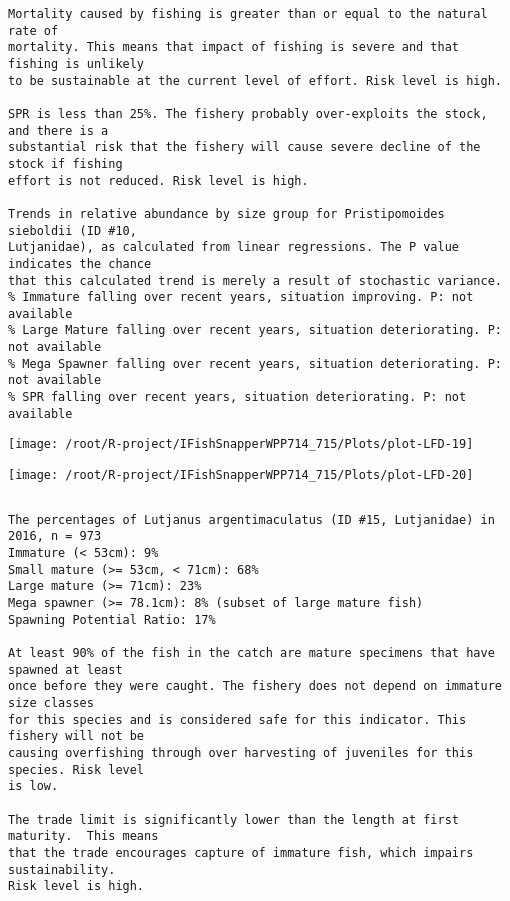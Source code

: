 \documentclass{report}\usepackage[]{graphicx}\usepackage[]{color}
\makeatletter
\def\maxwidth{ %
  \ifdim\Gin@nat@width>\linewidth
    \linewidth
  \else
    \Gin@nat@width
  \fi
}
\newenvironment{kframe}{%
 \def\at@end@of@kframe{}%
 \ifinner\ifhmode%
  \def\at@end@of@kframe{\end{minipage}}%
  \begin{minipage}{\columnwidth}%
 \fi\fi%
 \def\FrameCommand##1{\hskip\@totalleftmargin \hskip-\fboxsep
 \colorbox{shadecolor}{##1}\hskip-\fboxsep
     \hskip-\linewidth \hskip-\@totalleftmargin \hskip\columnwidth}%
 \MakeFramed {\advance\hsize-\width
   \@totalleftmargin\z@ \linewidth\hsize
   \@setminipage}}%
 {\par\unskip\endMakeFramed%
 \at@end@of@kframe}
\newenvironment{knitrout}{}{} %
\makeatother
\begin{document}
\begin{knitrout}
\begin{kframe}
\begin{verbatim}
Mortality caused by fishing is greater than or equal to the natural rate of
mortality. This means that impact of fishing is severe and that fishing is unlikely
to be sustainable at the current level of effort. Risk level is high.
 
SPR is less than 25%. The fishery probably over-exploits the stock, and there is a
substantial risk that the fishery will cause severe decline of the stock if fishing
effort is not reduced. Risk level is high.
 
Trends in relative abundance by size group for Pristipomoides sieboldii (ID #10,
Lutjanidae), as calculated from linear regressions. The P value indicates the chance
that this calculated trend is merely a result of stochastic variance.
% Immature falling over recent years, situation improving. P: not available
% Large Mature falling over recent years, situation deteriorating. P: not available
% Mega Spawner falling over recent years, situation deteriorating. P: not available
% SPR falling over recent years, situation deteriorating. P: not available
\end{verbatim}
\end{kframe}
\texttt{[image: /root/R-project/IFishSnapperWPP714\_715/Plots/plot-LFD-19]} 

\texttt{[image: /root/R-project/IFishSnapperWPP714\_715/Plots/plot-LFD-20]} 
\begin{kframe}\begin{verbatim}
\end{verbatim}
\end{kframe}
\clearpage
\newpage
\begin{kframe}\begin{verbatim}The percentages of Lutjanus argentimaculatus (ID #15, Lutjanidae) in 2016, n = 973
Immature (< 53cm): 9%
Small mature (>= 53cm, < 71cm): 68%
Large mature (>= 71cm): 23%
Mega spawner (>= 78.1cm): 8% (subset of large mature fish)
Spawning Potential Ratio: 17%
 
At least 90% of the fish in the catch are mature specimens that have spawned at least
once before they were caught. The fishery does not depend on immature size classes
for this species and is considered safe for this indicator. This fishery will not be
causing overfishing through over harvesting of juveniles for this species. Risk level
is low.

The trade limit is significantly lower than the length at first maturity.  This means
that the trade encourages capture of immature fish, which impairs sustainability.
Risk level is high.


\end{verbatim}
\end{kframe}
\end{knitrout}
\end{document}
